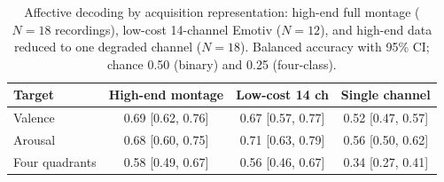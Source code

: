 \begin{table}[t]
  \centering
  \caption{Affective decoding by acquisition representation: high-end full montage
  ($N=18$ recordings), low-cost 14-channel Emotiv ($N=12$), and high-end data
  reduced to one degraded channel ($N=18$). Balanced accuracy with 95\% CI;
  chance 0.50 (binary) and 0.25 (four-class).}
  \label{tab:affective}
  \begin{tabular}{lccc}
    \hline
    Target & High-end montage & Low-cost 14 ch & Single channel \\
    \hline
    Valence & 0.69 [0.62, 0.76] & 0.67 [0.57, 0.77] & 0.52 [0.47, 0.57] \\
    Arousal & 0.68 [0.60, 0.75] & 0.71 [0.63, 0.79] & 0.56 [0.50, 0.62] \\
    Four quadrants & 0.58 [0.49, 0.67] & 0.56 [0.46, 0.67] & 0.34 [0.27, 0.41] \\
    \hline
  \end{tabular}
\end{table}
